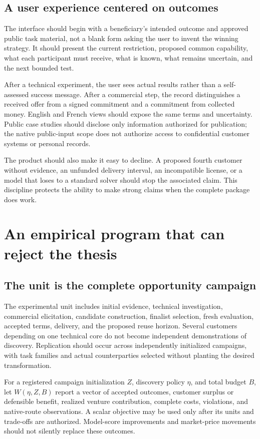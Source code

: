 \documentclass[11pt,letterpaper]{article}
\theoremstyle{remark}\newtheorem{remark}{Remark}[section]
\begin{document}
\subsection{A user experience centered on outcomes}
The interface should begin with a beneficiary's intended outcome and approved public task material, not a blank form asking the user to invent the winning strategy. It should present the current restriction, proposed common capability, what each participant must receive, what is known, what remains uncertain, and the next bounded test.

After a technical experiment, the user sees actual results rather than a self-assessed success message. After a commercial step, the record distinguishes a received offer from a signed commitment and a commitment from collected money. English and French views should expose the same terms and uncertainty. Public case studies should disclose only information authorized for publication; the native public-input scope does not authorize access to confidential customer systems or personal records.

The product should also make it easy to decline. A proposed fourth customer without evidence, an unfunded delivery interval, an incompatible license, or a model that loses to a standard solver should stop the associated claim. This discipline protects the ability to make strong claims when the complete package does work.

\section{An empirical program that can reject the thesis}
\label{sec:evaluation}
\subsection{The unit is the complete opportunity campaign}
The experimental unit includes initial evidence, technical investigation, commercial elicitation, candidate construction, finalist selection, fresh evaluation, accepted terms, delivery, and the proposed reuse horizon. Several customers depending on one technical core do not become independent demonstrations of discovery. Replication should occur across independently initialized campaigns, with task families and actual counterparties selected without planting the desired transformation.

For a registered campaign initialization $Z$, discovery policy $\eta$, and total budget $B$, let $W(\eta,Z,B)$ report a vector of accepted outcomes, customer surplus or defensible benefit, realized venture contribution, complete costs, violations, and native-route observations. A scalar objective may be used only after its units and trade-offs are authorized. Model-score improvements and market-price movements should not silently replace these outcomes.
\end{document}

